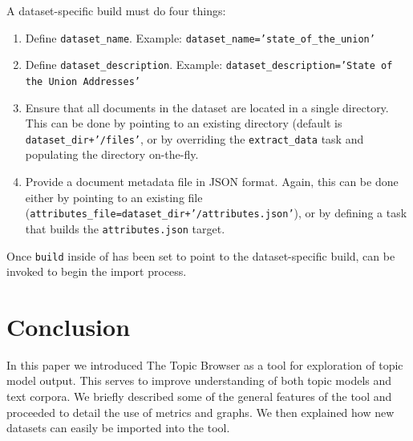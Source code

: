 \documentclass[11pt]{article}
\begin{document}
A dataset-specific build must do four things:
\begin{enumerate}
\item Define \texttt{dataset\_name}.
    \newline Example: \texttt{dataset\_name='state\_of\_the\_union'}
  \item Define \texttt{dataset\_description}.
    \newline Example: \texttt{dataset\_description='State of the Union Addresses'}
  \item Ensure that all documents in the dataset are located in a single directory.
    This can be done by pointing to an existing directory (default is \texttt{dataset\_dir+'/files'}, or by overriding the
    \texttt{extract\_data} task and populating the directory on-the-fly.
  \item Provide a document metadata file in JSON format. Again, this can be done
    either by pointing to an existing file (\texttt{attributes\_\allowbreak{}file=\allowbreak{}dataset\_\allowbreak{}dir\allowbreak{}+\allowbreak{}'/attributes\allowbreak{}.json'}), or by defining a task that builds the \texttt{attributes.json} target.
\end{enumerate}

Once \texttt{build} inside of \texttt{\buildscript} has been set to point to
the dataset-specific build, \texttt{\buildscript} can be invoked to begin the
import process.

\section{Conclusion}
In this paper we introduced The Topic Browser as a tool for exploration of
topic model output. This serves to improve understanding of both topic models
and text corpora. We briefly described some of the general features of the tool
and proceeded to detail the use of metrics and graphs. We then explained how
new datasets can easily be imported into the tool.
\end{document}
